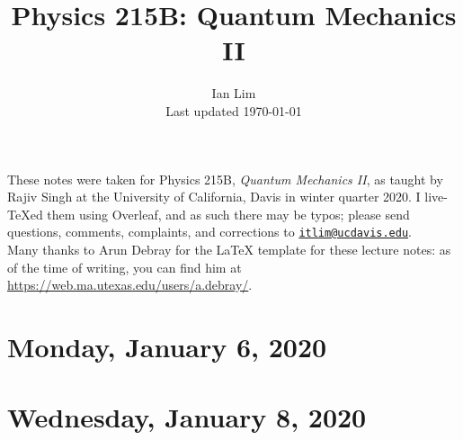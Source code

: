 \documentclass{../mynotes}
\begin{document}
\title{Physics 215B: Quantum Mechanics II}
\author{Ian Lim\\ Last updated \today}
\maketitle
{\small\noindent These notes were taken for Physics 215B, \emph{Quantum Mechanics II}, as taught by Rajiv Singh at the University of California, Davis in winter quarter 2020. I live-\TeX ed them using Overleaf, and as such there may be typos; please send questions, comments, complaints, and corrections to 
\href{mailto:itlim@ucdavis.edu?subject=215B\%20Lecture\%20Notes}{\texttt{itlim@ucdavis.edu}}.\\
Many thanks to Arun Debray for the {\LaTeX} template for these lecture notes: as of the time of writing, you can find him at \url{https://web.ma.utexas.edu/users/a.debray/}.}

\tableofcontents

\section{Monday, January 6, 2020}
	
\section{Wednesday, January 8, 2020}
    

% 	
%     

%     

% 	
%     
\end{document}
